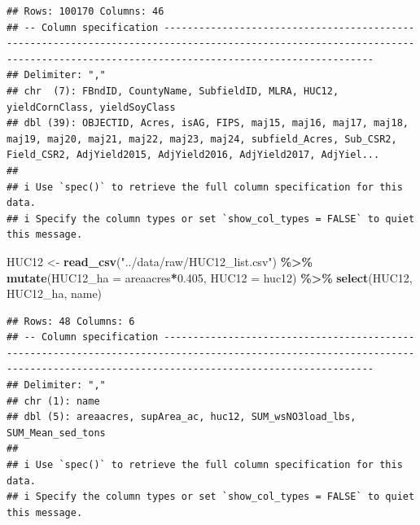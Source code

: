 \documentclass[
]{article}
\newenvironment{Shaded}{\begin{snugshade}}{\end{snugshade}}
\newcommand{\AttributeTok}[1]{\textcolor[rgb]{0.13,0.29,0.53}{#1}}
\newcommand{\FloatTok}[1]{\textcolor[rgb]{0.00,0.00,0.81}{#1}}
\newcommand{\FunctionTok}[1]{\textcolor[rgb]{0.13,0.29,0.53}{\textbf{#1}}}
\newcommand{\NormalTok}[1]{#1}
\newcommand{\OtherTok}[1]{\textcolor[rgb]{0.56,0.35,0.01}{#1}}
\newcommand{\SpecialCharTok}[1]{\textcolor[rgb]{0.81,0.36,0.00}{\textbf{#1}}}
\newcommand{\StringTok}[1]{\textcolor[rgb]{0.31,0.60,0.02}{#1}}
\begin{document}
\begin{verbatim}
## Rows: 100170 Columns: 46
## -- Column specification --------------------------------------------------------------------------------------------------------------------------------------------------------------------------------
## Delimiter: ","
## chr  (7): FBndID, CountyName, SubfieldID, MLRA, HUC12, yieldCornClass, yieldSoyClass
## dbl (39): OBJECTID, Acres, isAG, FIPS, maj15, maj16, maj17, maj18, maj19, maj20, maj21, maj22, maj23, maj24, subfield_Acres, Sub_CSR2, Field_CSR2, AdjYield2015, AdjYield2016, AdjYield2017, AdjYiel...
## 
## i Use `spec()` to retrieve the full column specification for this data.
## i Specify the column types or set `show_col_types = FALSE` to quiet this message.
\end{verbatim}

\begin{Shaded}
\begin{Highlighting}[]
\NormalTok{HUC12 }\OtherTok{\textless{}{-}} \FunctionTok{read\_csv}\NormalTok{(}\StringTok{"../data/raw/HUC12\_list.csv"}\NormalTok{) }\SpecialCharTok{\%\textgreater{}\%}
  \FunctionTok{mutate}\NormalTok{(}\AttributeTok{HUC12\_ha =}\NormalTok{ areaacres}\SpecialCharTok{*}\FloatTok{0.405}\NormalTok{,}
         \AttributeTok{HUC12 =}\NormalTok{ huc12) }\SpecialCharTok{\%\textgreater{}\%}
  \FunctionTok{select}\NormalTok{(HUC12, HUC12\_ha, name)}
\end{Highlighting}
\end{Shaded}

\begin{verbatim}
## Rows: 48 Columns: 6
## -- Column specification --------------------------------------------------------------------------------------------------------------------------------------------------------------------------------
## Delimiter: ","
## chr (1): name
## dbl (5): areaacres, supArea_ac, huc12, SUM_wsNO3load_lbs, SUM_Mean_sed_tons
## 
## i Use `spec()` to retrieve the full column specification for this data.
## i Specify the column types or set `show_col_types = FALSE` to quiet this message.
\end{verbatim}
\end{document}
